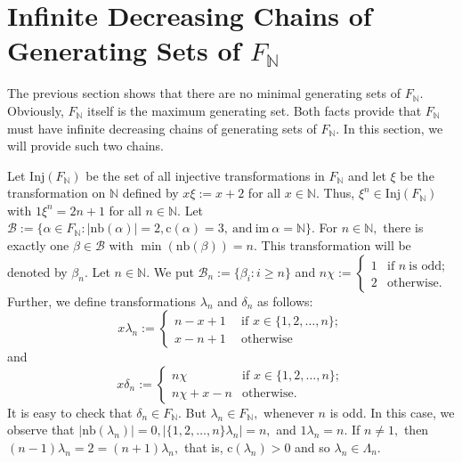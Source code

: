 \documentclass[11pt]{article}
\theoremstyle{plain}
\theoremstyle{definition}
\newcommand{\im}{\mathrm{im~}}
\newcommand{\collapse}{\mathrm{c}}
\newcommand{\nb}{\mathrm{nb}}
\newcommand{\Inj}{\mathrm{Inj}}
\begin{document}
\section{Infinite Decreasing Chains of Generating Sets of $F_{\mathbb{N}}$}
The previous section shows that there are no minimal generating sets of $F_{\mathbb{N}}.$ Obviously, $F_{\mathbb{N}}$ itself is the maximum generating set. Both facts provide that $F_{\mathbb{N}}$ must have infinite decreasing chains of generating sets of $F_{\mathbb{N}}.$ In this section, we will provide such two chains.

Let $\Inj(F_{\mathbb{N}})$ be the set of all injective transformations in $F_{\mathbb{N}}$ and let $\xi$ be the transformation on $\mathbb{N}$ defined by $x\xi:=x+2$ for all $x\in\mathbb{N}.$ Thus, $\xi^{n}\in\Inj(F_{\mathbb{N}})$ with $1\xi^{n}=2n+1$ for all $n\in\mathbb{N}.$ Let $\mathcal{B}:=\{\alpha\in F_{\mathbb{N}}:\left\vert\nb(\alpha)\right\vert =2, \collapse(\alpha)=3,~\text{and}~\im\alpha=\mathbb{N}\}.$ For $n\in\mathbb{N},$ there is exactly one $\beta\in\mathcal{B}$ with $\min(\nb(\beta))= n.$ This transformation will be denoted by $\beta_{n}.$ Let $n\in\mathbb{N}.$ We put $\mathcal{B}_{n}:=\{\beta_{i}:i\geq n\}$ and $n\chi:=\begin{cases}
1&\text{if }n~\text{is odd};\\
2&\text{otherwise}.
\end{cases}$ \\Further, we define transformations $\lambda_{n}$ and $\delta_{n}$ as follows:
$$x\lambda_{n}:=\begin{cases}
n-x+1~~&\text{if }x\in\{1,2,\ldots,n\};\\
x-n+1&\text{otherwise}
\end{cases}$$
and
$$x\delta_{n}:=\begin{cases}
n\chi~~&\text{if }x\in\{1,2,\ldots,n\};\\
n\chi+x-n&\text{otherwise.}
\end{cases}$$
It is easy to check that $\delta_{n}\in F_{\mathbb{N}}.$ But $\lambda_{n}\in F_{\mathbb{N}},$ whenever $n$ is odd. In this case, we observe that $\left\vert \nb(\lambda_{n})\right\vert=0,\left\vert\{1,2,\ldots, n\}\lambda_{n}\right\vert=n,$ and $1\lambda_{n}=n.$ If $n\not=1,$ then $(n-1)\lambda_{n}=2=(n+1)\lambda_{n},$ that is, $\collapse(\lambda_{n})>0$ and so $\lambda_{n}\in\Lambda_{n}.$
\end{document}
